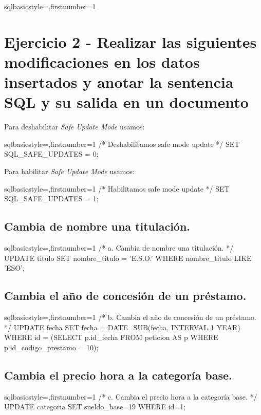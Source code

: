 \begin{sourcecodep}[]{sql}{basicstyle={\fontsize{10}{10}\selectfont\ttfamily},firstnumber=1}{}
\section{Ejercicio 2 - Realizar las siguientes modificaciones en los datos insertados y anotar la sentencia SQL y su salida en un documento}
		\newp Para deshabilitar \textit{Safe Update Mode} usamos:
			\begin{sourcecodep}[]{sql}{basicstyle={\fontsize{10}{10}\selectfont\ttfamily},firstnumber=1}{}
				/* Deshabilitamos safe mode update */
				SET SQL_SAFE_UPDATES = 0;\end{sourcecodep}
		\newp Para habilitar \textit{Safe Update Mode} usamos:
			\begin{sourcecodep}[]{sql}{basicstyle={\fontsize{10}{10}\selectfont\ttfamily},firstnumber=1}{}
				/* Habilitamos safe mode update */
				SET SQL_SAFE_UPDATES = 1;\end{sourcecodep}
	\subsection{Cambia de nombre una titulación.}
		\begin{sourcecodep}[]{sql}{basicstyle={\fontsize{10}{10}\selectfont\ttfamily},firstnumber=1}{}
			/* a. Cambia de nombre una titulación. */
			UPDATE titulo 
				SET nombre_titulo = 'E.S.O.' 
				WHERE nombre_titulo LIKE 'ESO';\end{sourcecodep}
	\subsection{Cambia el año de concesión de un préstamo.}
		\begin{sourcecodep}[]{sql}{basicstyle={\fontsize{10}{10}\selectfont\ttfamily},firstnumber=1}{}
			/* b. Cambia el año de concesión de un préstamo. */
			UPDATE fecha
				SET fecha = DATE_SUB(fecha, INTERVAL 1 YEAR)
				WHERE id = (SELECT p.id_fecha FROM peticion AS p
				WHERE p.id_codigo_prestamo = 10);\end{sourcecodep}
	\subsection{Cambia el precio hora a la categoría base.}
		\begin{sourcecodep}[]{sql}{basicstyle={\fontsize{10}{10}\selectfont\ttfamily},firstnumber=1}{}
			/* c. Cambia el precio hora a la categoría base. */
			UPDATE categoria 
				SET sueldo_base=19 
				WHERE id=1;\end{sourcecodep}
\newpage

\end{sourcecodep}
